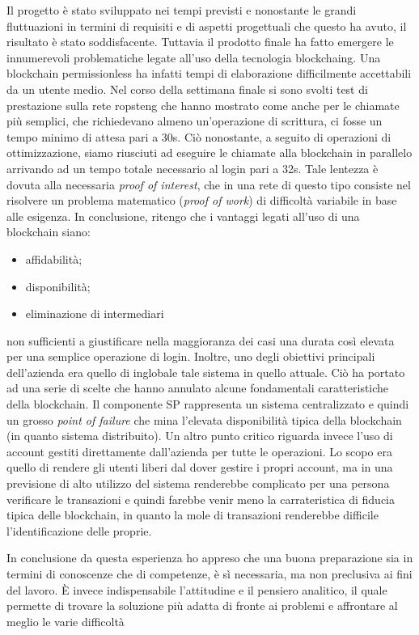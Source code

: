 Il progetto è stato sviluppato nei tempi previsti e nonostante le grandi fluttuazioni in termini di requisiti e di aspetti progettuali che questo ha avuto, il risultato è stato soddisfacente. Tuttavia il prodotto finale ha fatto emergere le innumerevoli problematiche legate all'uso della tecnologia \gls{blockchaing}. Una blockchain permissionless ha infatti tempi di elaborazione difficilmente accettabili da un utente medio. Nel corso della settimana finale si sono svolti test di prestazione sulla rete \gls{ropsteng} che hanno mostrato come anche per le chiamate più semplici, che richiedevano almeno un'operazione di scrittura, ci fosse un tempo minimo di attesa pari a 30s. Ciò nonostante, a seguito di operazioni di ottimizzazione, siamo riusciuti ad eseguire le chiamate alla blockchain in parallelo arrivando ad un tempo totale necessario al login pari a 32s. Tale lentezza è dovuta alla necessaria \emph{proof of interest}, che in una rete di questo tipo consiste nel risolvere un problema matematico (\emph{proof of work}) di difficoltà variabile in base alle esigenza.  
In conclusione, ritengo che i vantaggi legati all'uso di una blockchain siano:
\begin{itemize}
    \item affidabilità;
    \item disponibilità;
    \item eliminazione di intermediari
\end{itemize} 
non sufficienti a giustificare nella maggioranza dei casi una durata così elevata per una semplice operazione di login.
Inoltre, uno degli obiettivi principali dell'azienda era quello di inglobale tale sistema in quello attuale. Ciò ha portato ad una serie di scelte che hanno annulato alcune fondamentali caratteristiche della blockchain. Il componente SP rappresenta un sistema centralizzato e quindi un grosso \emph{point of failure} che mina l'elevata disponibilità tipica della blockchain (in quanto sistema distribuito). Un altro punto critico riguarda invece l'uso di account gestiti direttamente dall'azienda per tutte le operazioni. Lo scopo era quello di rendere gli utenti liberi dal dover gestire i propri account, ma in una previsione di alto utilizzo del sistema renderebbe complicato per una persona verificare le transazioni e quindi farebbe venir meno la carrateristica di fiducia tipica delle blockchain, in quanto la mole di transazioni renderebbe difficile l'identificazione delle proprie.

In conclusione da questa esperienza ho appreso che una buona preparazione sia in termini di conoscenze che di competenze, è sì necessaria, ma non preclusiva ai fini del lavoro. È invece indispensabile l'attitudine e il pensiero analitico, il quale permette di trovare la soluzione più adatta di fronte ai problemi e affrontare al meglio le varie difficoltà 

